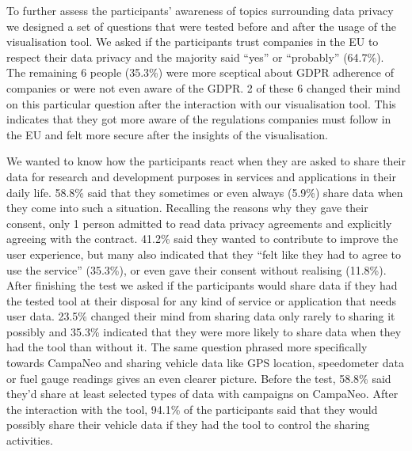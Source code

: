 \documentclass[../paper.tex]{subfiles}
\begin{document}
  To further assess the participants' awareness of topics surrounding data privacy we designed a set of questions that were tested before and after the usage of the visualisation tool.
  We asked if the participants trust companies in the EU to respect their data privacy and the majority said ``yes'' or ``probably'' (64.7\%).
  The remaining 6 people (35.3\%) were more sceptical about GDPR adherence of companies or were not even aware of the GDPR.
  2 of these 6 changed their mind on this particular question after the interaction with our visualisation tool.
  This indicates that they got more aware of the regulations companies must follow in the EU and felt more secure after the insights of the visualisation.

  We wanted to know how the participants react when they are asked to share their data for research and development purposes in services and applications in their daily life.
  58.8\% said that they sometimes or even always (5.9\%) share data when they come into such a situation.
  Recalling the reasons why they gave their consent, only 1 person admitted to read data privacy agreements and explicitly agreeing with the contract.
  41.2\% said they wanted to contribute to improve the user experience, but many also indicated that they ``felt like they had to agree to use the service'' (35.3\%), or even gave their consent without realising (11.8\%).
  After finishing the test we asked if the participants would share data if they had the tested tool at their disposal for any kind of service or application that needs user data.
  23.5\% changed their mind from sharing data only rarely to sharing it possibly and 35.3\% indicated that they were more likely to share data when they had the tool than without it.
  The same question phrased more specifically towards CampaNeo and sharing vehicle data like GPS location, speedometer data or fuel gauge readings gives an even clearer picture.
  Before the test, 58.8\% said they'd share at least selected types of data with campaigns on CampaNeo. After the interaction with the tool, 94.1\% of the participants said that they would possibly share their vehicle data if they had the tool to control the sharing activities.
\end{document}
